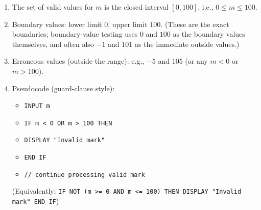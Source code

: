 \documentclass[11pt]{article}
\begin{document}
\begin{corrige}
\begin{enumerate}
\item The set of valid values for $m$ is the closed interval $[0, 100]$, i.e., $0 \le m \le 100$.
\item Boundary values: lower limit $0$, upper limit $100$. (These are the exact boundaries; boundary-value testing uses $0$ and $100$ as the boundary values themselves, and often also $-1$ and $101$ as the immediate outside values.)
\item Erroneous values (outside the range): e.g., $-5$ and $105$ (or any $m < 0$ or $m > 100$).
\item Pseudocode (guard-clause style):
\begin{itemize}
\item[] \texttt{INPUT m}
\item[] \texttt{IF m < 0 OR m > 100 THEN}
\item[] \texttt{\quad DISPLAY "Invalid mark"}
\item[] \texttt{END IF}
\item[] \texttt{// continue processing valid mark}
\end{itemize}
(Equivalently: \texttt{IF NOT (m >= 0 AND m <= 100) THEN DISPLAY "Invalid mark" END IF})
\end{enumerate}
\end{corrige}
\end{document}
